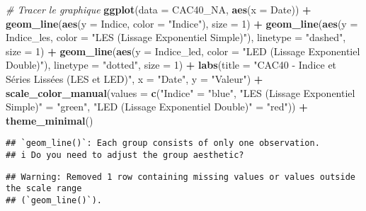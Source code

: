 \documentclass[
]{article}
\newenvironment{Shaded}{\begin{snugshade}}{\end{snugshade}}
\newcommand{\AttributeTok}[1]{\textcolor[rgb]{0.13,0.29,0.53}{#1}}
\newcommand{\CommentTok}[1]{\textcolor[rgb]{0.56,0.35,0.01}{\textit{#1}}}
\newcommand{\DecValTok}[1]{\textcolor[rgb]{0.00,0.00,0.81}{#1}}
\newcommand{\FunctionTok}[1]{\textcolor[rgb]{0.13,0.29,0.53}{\textbf{#1}}}
\newcommand{\NormalTok}[1]{#1}
\newcommand{\OtherTok}[1]{\textcolor[rgb]{0.56,0.35,0.01}{#1}}
\newcommand{\SpecialCharTok}[1]{\textcolor[rgb]{0.81,0.36,0.00}{\textbf{#1}}}
\newcommand{\StringTok}[1]{\textcolor[rgb]{0.31,0.60,0.02}{#1}}
\begin{document}
\begin{Shaded}
\begin{Highlighting}[]
\CommentTok{\# Tracer le graphique}
\FunctionTok{ggplot}\NormalTok{(}\AttributeTok{data =}\NormalTok{ CAC40\_NA, }\FunctionTok{aes}\NormalTok{(}\AttributeTok{x =}\NormalTok{ Date)) }\SpecialCharTok{+}
  \FunctionTok{geom\_line}\NormalTok{(}\FunctionTok{aes}\NormalTok{(}\AttributeTok{y =}\NormalTok{ Indice, }\AttributeTok{color =} \StringTok{"Indice"}\NormalTok{), }\AttributeTok{size =} \DecValTok{1}\NormalTok{) }\SpecialCharTok{+}
  \FunctionTok{geom\_line}\NormalTok{(}\FunctionTok{aes}\NormalTok{(}\AttributeTok{y =}\NormalTok{ Indice\_les, }\AttributeTok{color =} \StringTok{"LES (Lissage Exponentiel Simple)"}\NormalTok{), }\AttributeTok{linetype =} \StringTok{"dashed"}\NormalTok{, }\AttributeTok{size =} \DecValTok{1}\NormalTok{) }\SpecialCharTok{+}
  \FunctionTok{geom\_line}\NormalTok{(}\FunctionTok{aes}\NormalTok{(}\AttributeTok{y =}\NormalTok{ Indice\_led, }\AttributeTok{color =} \StringTok{"LED (Lissage Exponentiel Double)"}\NormalTok{), }\AttributeTok{linetype =} \StringTok{"dotted"}\NormalTok{, }\AttributeTok{size =} \DecValTok{1}\NormalTok{) }\SpecialCharTok{+}
  \FunctionTok{labs}\NormalTok{(}\AttributeTok{title =} \StringTok{"CAC40 {-} Indice et Séries Lissées (LES et LED)"}\NormalTok{,}
       \AttributeTok{x =} \StringTok{"Date"}\NormalTok{,}
       \AttributeTok{y =} \StringTok{"Valeur"}\NormalTok{) }\SpecialCharTok{+}
  \FunctionTok{scale\_color\_manual}\NormalTok{(}\AttributeTok{values =} \FunctionTok{c}\NormalTok{(}\StringTok{"Indice"} \OtherTok{=} \StringTok{"blue"}\NormalTok{, }
                                \StringTok{"LES (Lissage Exponentiel Simple)"} \OtherTok{=} \StringTok{"green"}\NormalTok{, }
                                \StringTok{"LED (Lissage Exponentiel Double)"} \OtherTok{=} \StringTok{"red"}\NormalTok{)) }\SpecialCharTok{+}
  \FunctionTok{theme\_minimal}\NormalTok{()}
\end{Highlighting}
\end{Shaded}

\begin{verbatim}
## `geom_line()`: Each group consists of only one observation.
## i Do you need to adjust the group aesthetic?
\end{verbatim}

\begin{verbatim}
## Warning: Removed 1 row containing missing values or values outside the scale range
## (`geom_line()`).
\end{verbatim}
\end{document}
